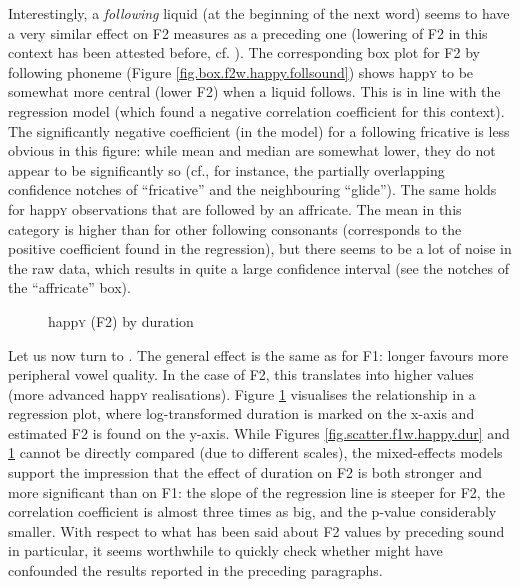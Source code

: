 Interestingly, a \emph{following} liquid (at the beginning of the next word) seems to have a very similar effect on F2 measures as a preceding one (lowering of F2 in this context has been attested before, cf. \textcite[26]{lehiste1964}).
The corresponding box plot for F2 by following phoneme (Figure \ref{fig.box.f2w.happy.follsound}) shows happ\textsc{y} to be somewhat more central (lower F2) when a liquid follows.
This is in line with the regression model (which found a negative correlation coefficient for this context).
The significantly negative coefficient (in the model) for a following fricative is less obvious in this figure: while mean and median are somewhat lower, they do not appear to be significantly so (cf., for instance, the partially overlapping confidence notches of ``fricative'' and the neighbouring ``glide'').
The same holds for happ\textsc{y} observations that are followed by an affricate.
The mean in this category is higher than for other following consonants (corresponds to the positive coefficient found in the regression), but there seems to be a lot of noise in the raw data, which results in quite a large confidence interval (see the notches of the ``affricate'' box).

\begin{figure}[h!]
	\centering
		\resizebox{0.5\linewidth}{!}{} 
	\caption{happ\textsc{y} (F2) by duration}
	\label{fig.scatter.f2w.happy.dur}
\end{figure}

Let us now turn to .
The general effect is the same as for F1: longer  favours more peripheral vowel quality.
In the case of F2, this translates into higher values (more advanced happ\textsc{y} realisations).
Figure \ref{fig.scatter.f2w.happy.dur} visualises the relationship in a regression plot, where log-transformed duration is marked on the x-axis and estimated F2 is found on the y-axis.
While Figures \ref{fig.scatter.f1w.happy.dur} and \ref{fig.scatter.f2w.happy.dur} cannot be directly compared (due to different scales), the mixed-effects models support the impression that the effect of duration on F2 is both stronger and more significant than on F1: the slope of the regression line is steeper for F2, the correlation coefficient is almost three times as big, and the p-value considerably smaller.
With respect to what has been said about F2 values by preceding sound in particular, it seems worthwhile to quickly check whether  might have confounded the results reported in the preceding paragraphs.

